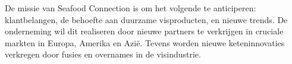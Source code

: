 De missie van Seafood Connection is om het volgende te anticiperen: klantbelangen, de behoefte aan duurzame visproducten, en nieuwe trends. De onderneming wil dit realiseren door nieuwe partners te verkrijgen in cruciale markten in Europa, Amerika en Azië. Tevens worden nieuwe keteninnovaties verkregen door fusies en overnames in de visindustrie. \citep{sfcwebsite}